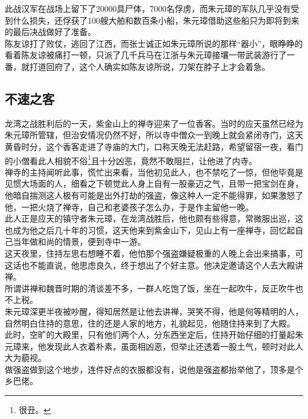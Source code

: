 \begin{multicols}{\theparacolNo}
此战汉军在战场上留下了20000具尸体，7000名俘虏，而朱元璋的军队几乎没有受到什么损失，还俘获了100艘大舶和数百条小船，朱元璋借助这些船只为即将到来的最后决战做好了准备。\\

陈友谅打了败仗，逃回了江西，而张士诚正如朱元璋所说的那样“器小”，眼睁睁的看着陈友谅被痛打一顿，只派了几千兵马在江浙与朱元璋接壤一带武装游行了一番，就打道回府了，这个人确实如陈友谅所说，刀架在脖子上才会着急。\\

\subsection{不速之客}
龙湾之战胜利后的一天，紫金山上的禅寺迎来了一位香客。当时的应天虽然已经为朱元璋所管辖，但治安情况仍然不好，所以寺中僧众一到晚上就会紧闭寺门，这天黄昏时分，这个香客走进了寺庙的大门，口称天晚无法赶路，希望留宿一夜，看门的小僧看此人相貌不俗\footnote{很丑。}且十分凶恶，竟然不敢阻拦，让他进了内寺。\\

禅寺的主持闻听此事，慌忙出来看，当他初见此人，也不禁吃了一惊，但他毕竟是见惯大场面的人，细看之下顿觉此人身上自有一股豪迈之气，且带一把宝剑在身，他暗自揣测这人极有可能是出外打劫的强盗，像这种人一定不能得罪，如果激怒了他，一把火烧了禅寺，自己和老婆孩子怎么办，于是作主留他一晚。\\

此人正是应天的镇守者朱元璋，在龙湾战胜后，他也颇有些得意，常微服出巡，这也成为他之后几十年的习惯，这天他来到紫金山下，见山上有一座禅寺，回忆起自己当年做和尚的情景，便到寺中一游。\\

这天夜里，住持左思右想睡不着，他怕那个强盗嫌疑极重的人晚上会出来搞事，可这话也不能直说，他思虑良久，终于想出了个好主意。他决定邀请这个人去大殿讲禅。\\

所谓讲禅和魏晋时期的清谈差不多，一群人吃饱了饭，坐在一起吹牛，反正吹牛也不上税。\\

朱元璋深更半夜被吵醒，得知居然是让他去讲禅，哭笑不得，他是何等精明的人，自然明白住持的意思，住的还是人家的地方，礼貌起见，他随住持来到了大殿。\\

此时，空旷的大殿里，只有他们两个人，分东西坐定后，住持开始仔细的打量起朱元璋来，他发现此人衣着朴素，虽面相凶恶，但举止还透着一股土气，顿时对此人大为藐视。\\

做强盗做到这个地步，连件好点的衣服都没有，说他是强盗都抬举他了，顶多是个乡巴佬。\\


\end{multicols}
